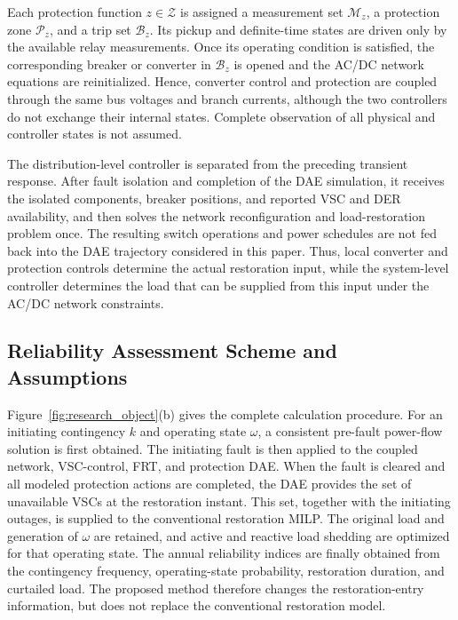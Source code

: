 Each protection function $z\in\mathcal Z$ is assigned a measurement set
$\mathcal M_z$, a protection zone $\mathcal P_z$, and a trip set
$\mathcal B_z$. Its pickup and definite-time states are driven only by the
available relay measurements. Once its operating condition is satisfied, the
corresponding breaker or converter in $\mathcal B_z$ is opened and the AC/DC
network equations are reinitialized. Hence, converter control and protection
are coupled through the same bus voltages and branch currents, although the two
controllers do not exchange their internal states. Complete observation of all
physical and controller states is not assumed.

The distribution-level controller is separated from the preceding transient
response. After fault isolation and completion of the DAE simulation, it
receives the isolated components, breaker positions, and reported VSC and DER
availability, and then solves the network reconfiguration and load-restoration
problem once. The resulting switch operations and power schedules are not fed
back into the DAE trajectory considered in this paper. Thus, local converter
and protection controls determine the actual restoration input, while the
system-level controller determines the load that can be supplied from this
input under the AC/DC network constraints.

\subsection{Reliability Assessment Scheme and Assumptions}
\label{sec:assessment_scheme}
Figure~\ref{fig:research_object}(b) gives the complete calculation procedure.
For an initiating contingency $k$ and operating state $\omega$, a consistent
pre-fault power-flow solution is first obtained. The initiating fault is then
applied to the coupled network, VSC-control, FRT, and protection DAE. When the
fault is cleared and all modeled protection actions are completed, the DAE
provides the set of unavailable VSCs at the restoration instant. This set,
together with the initiating outages, is supplied to the conventional
restoration MILP. The original load and generation of $\omega$ are retained,
and active and reactive load shedding are optimized for that operating state.
The annual reliability indices are finally obtained from the contingency
frequency, operating-state probability, restoration duration, and curtailed
load. The proposed method therefore changes the restoration-entry information,
but does not replace the conventional restoration model.

